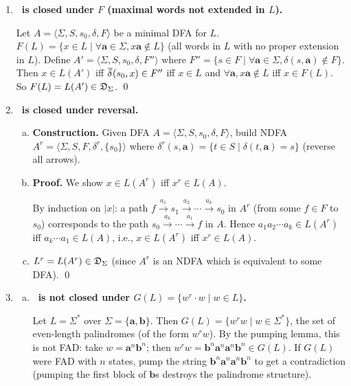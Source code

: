\begin{enumerate}[{5.}1. ]
\item \textbf{\DSIG\ is closed under $F$ (maximal words not extended in $L$).}

Let $A=\langle\Sigma,S,s_0,\delta,F\rangle$ be a minimal DFA for $L$.
$F(L)=\{x\in L\mid\forall\pmb{a}\in\Sigma, x\pmb{a}\notin L\}$
(all words in $L$ with no proper extension in $L$).
Define $A'=\langle\Sigma,S,s_0,\delta,F''\rangle$ where
$F''=\{s\in F\mid\forall\pmb{a}\in\Sigma,\delta(s,\pmb{a})\notin F\}$.
Then $x\in L(A')$ iff $\overline{\delta^{}}(s_0,x)\in F''$ iff $x\in L$ and $\forall\pmb{a},x\pmb{a}\notin L$ iff $x\in F(L)$.
So $F(L)=L(A')\in\mathfrak{D}_\Sigma$. \qed

\item \textbf{\DSIG\ is closed under reversal.}

\begin{enumerate}[(a)]
  \item \textbf{Construction.}  Given DFA $A=\langle\Sigma,S,s_0,\delta,F\rangle$,
  build NDFA $A^r=\langle\Sigma,S,F,\delta^r,\{s_0\}\rangle$ where
  $\delta^r(s,\pmb{a})=\{t\in S\mid\delta(t,\pmb{a})=s\}$ (reverse all arrows).

  \item \textbf{Proof.}  We show $x\in L(A^r)$ iff $x^r\in L(A)$.

  By induction on $|x|$: a path $f\xrightarrow{a_1}s_1\xrightarrow{a_2}\cdots\xrightarrow{a_k}s_0$ in $A^r$ (from some $f\in F$ to $s_0$) corresponds to the path $s_0\xrightarrow{a_k}\cdots\xrightarrow{a_1}f$ in $A$.  Hence $a_1a_2\cdots a_k\in L(A^r)$ iff $a_k\cdots a_1\in L(A)$, i.e., $x\in L(A^r)$ iff $x^r\in L(A)$.

  \item $L^r=L(A^r)\in\mathfrak{D}_\Sigma$ (since $A^r$ is an NDFA which is equivalent to some DFA). \qed
\end{enumerate}

\item \begin{enumerate}[(a)]
  \item \textbf{\DSIG\ is not closed under $G(L)=\{w^r\cdot w\mid w\in L\}$.}

  Let $L=\Sigma^*$ over $\Sigma=\{\pmb{a},\pmb{b}\}$.  Then $G(L)=\{w^rw\mid w\in\Sigma^*\}$, the set of even-length palindromes (of the form $w^rw$).  By the pumping lemma, this is not FAD: take $w=\pmb{a}^n\pmb{b}^n$; then $w^rw=\pmb{b}^n\pmb{a}^n\pmb{a}^n\pmb{b}^n\in G(L)$.  If $G(L)$ were FAD with $n$ states, pump the string $\pmb{b}^n\pmb{a}^n\pmb{a}^n\pmb{b}^n$ to get a contradiction (pumping the first block of $\pmb{b}$s destroys the palindrome structure).


\end{enumerate}
\end{enumerate}
